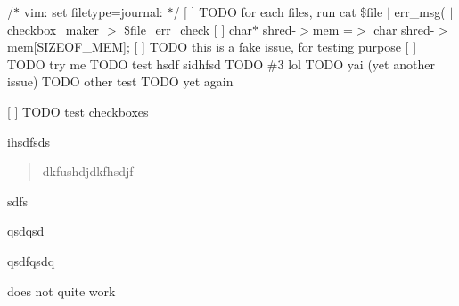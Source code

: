 /$\ast$ vim\+: set filetype=journal\+: $\ast$/ \mbox{[} \mbox{]} T\+O\+DO for each files, run cat \$file $\vert$ err\+\_\+msg( $\vert$ checkbox\+\_\+maker $>$ \$file\+\_\+err\+\_\+check \mbox{[} \mbox{]} char$\ast$ shred-\/$>$mem =$>$ char shred-\/$>$mem\mbox{[}S\+I\+Z\+E\+O\+F\+\_\+\+M\+EM\mbox{]}; \mbox{[} \mbox{]} T\+O\+DO this is a fake issue, for testing purpose \mbox{[} \mbox{]} T\+O\+DO try me T\+O\+DO test hsdf sidhfsd T\+O\+DO \#3 lol T\+O\+DO yai (yet another issue) T\+O\+DO other test T\+O\+DO yet again


\begin{DoxyItemize}
\item \mbox{[} \mbox{]} T\+O\+DO test checkboxes
\end{DoxyItemize}

ihsdfsds \begin{quote}
dkfushdjdkfhsdjf \end{quote}



\begin{DoxyEnumerate}
\item sdfs
\item qsdqsd
\item qsdfqsdq
\end{DoxyEnumerate}

does not quite work 